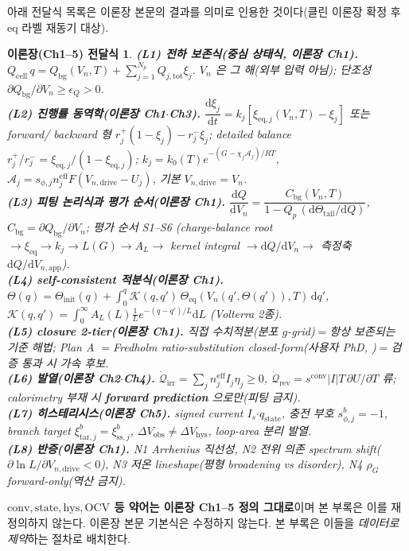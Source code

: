 \documentclass[11pt,a4paper]{article}
\newtheorem*{linkbox}{이론장(Ch1--5) 전달식}
\newcommand{\dd}{\mathrm{d}}
\newcommand{\eff}{\mathrm{eff}}
\newcommand{\eq}{\mathrm{eq}}
\newcommand{\app}{\mathrm{app}}
\newcommand{\drive}{\mathrm{drive}}
\newcommand{\bg}{\mathrm{bg}}
\newcommand{\cell}{\mathrm{cell}}
\newcommand{\OCV}{\mathrm{OCV}}
\newcommand{\tot}{\mathrm{tot}}
\newcommand{\irr}{\mathrm{irr}}
\newcommand{\rev}{\mathrm{rev}}
\newcommand{\sstat}{\mathrm{ss}}
\newcommand{\conv}{\mathrm{conv}}
\newcommand{\stt}{\mathrm{state}}
\newcommand{\hys}{\mathrm{hys}}
\newcommand{\tar}{\mathrm{tar}}
\newcommand{\obs}{\mathrm{obs}}
\begin{document}
아래 전달식 목록은 이론장 본문의 결과를 의미로 인용한 것이다(클린 이론장 확정 후 eq 라벨 재동기 대상).

\begin{linkbox}
\textbf{(L1) 전하 보존식(중심 상태식, 이론장 Ch1).} $Q_\cell\,q=Q_\bg(V_n,T)+\sum_{j=1}^{N_p}Q_{j,\tot}\xi_j$. $V_n$ 은
그 해(외부 입력 아님); 단조성 $\partial Q_\bg/\partial V_n\ge\epsilon_Q>0$.\\
\textbf{(L2) 진행률 동역학(이론장 Ch1$\cdot$Ch3).} $\dfrac{\dd\xi_j}{\dd t}=k_j[\xi_{\eq,j}(V_n,T)-\xi_j]$ 또는 forward/
backward 형 $r_j^+(1-\xi_j)-r_j^-\xi_j$; detailed balance $r_j^+/r_j^-=\xi_{\eq,j}/(1-\xi_{\eq,j})$;
$k_j=k_0(T)e^{-(G-\chi_j\mathcal A_j)/RT}$, $\mathcal A_j=s_{\phi,j}n_j^{\eff}F(V_{n,\drive}-U_j)$, 기본 $V_{n,\drive}=V_n$.\\
\textbf{(L3) 피팅 논리식과 평가 순서(이론장 Ch1).} $\dfrac{\dd Q}{\dd V_n}=\dfrac{C_\bg(V_n,T)}{1-Q_p\,(\dd\Theta_\mathrm{tail}/\dd Q)}$,
$C_\bg=\partial Q_\bg/\partial V_n$; 평가 순서 S1--S6 (charge-balance root $\to\xi_{\eq}\to k_j\to L(G)\to A_L\to$
kernel integral $\to\dd Q/\dd V_n\to$ 측정축 $\dd Q/\dd V_{n,\app}$).\\
\textbf{(L4) self-consistent 적분식(이론장 Ch1).} $\Theta(q)=\Theta_\mathrm{init}(q)+\int_0^q\mathcal K(q,q')\,
\Theta_\eq(V_n(q',\Theta(q')),T)\,\dd q'$, $\mathcal K(q,q')=\int_0^\infty A_L(L)\tfrac1L e^{-(q-q')/L}\dd L$ (Volterra 2종).\\
\textbf{(L5) closure 2-tier(이론장 Ch1).} \emph{직접 수치적분}(분포 $g$-grid)$=$항상 보존되는 기준 해법; \emph{Plan A}
$=$Fredholm ratio-substitution closed-form(사용자 PhD, \cite{lee2011,son2013,jcp2017})$=$검증 통과 시 가속 후보.\\
\textbf{(L6) 발열(이론장 Ch2$\cdot$Ch4).} $\dot{\mathcal Q}_\irr=\sum_j n_j^{\eff}I_j\eta_j\ge0$, $\dot{\mathcal Q}_\rev=
s^\conv|I|T\,\partial U/\partial T$ 류; calorimetry 부재 시 \textbf{forward prediction} 으로만(피팅 금지).\\
\textbf{(L7) 히스테리시스(이론장 Ch5).} signed current $I_s$$\cdot$$q_\stt$, 충전 부호 $s_{\phi,j}^b=-1$, branch target
$\xi_{\tar,j}^b=\xi_{\sstat,j}^b$, $\Delta V_\obs\ne\Delta V_\hys$, loop-area 분리 발열.\\
\textbf{(L8) 반증(이론장 Ch1).} N1 Arrhenius 직선성, N2 전위 의존 spectrum shift($\partial\ln L/\partial V_{n,\drive}<0$),
N3 저온 lineshape(평형 broadening vs disorder), N4 $\rho_G$ forward-only(역산 금지).
\end{linkbox}
\noindent\textbf{$\conv,\stt,\hys,\OCV$ 등 약어는 이론장 Ch1--5 정의 그대로}이며 본 부록은 이를 재정의하지 않는다.
이론장 본문 기본식은 수정하지 않는다. 본 부록은 이들을 \emph{데이터로 제약}하는 절차로 배치한다.
\end{document}
